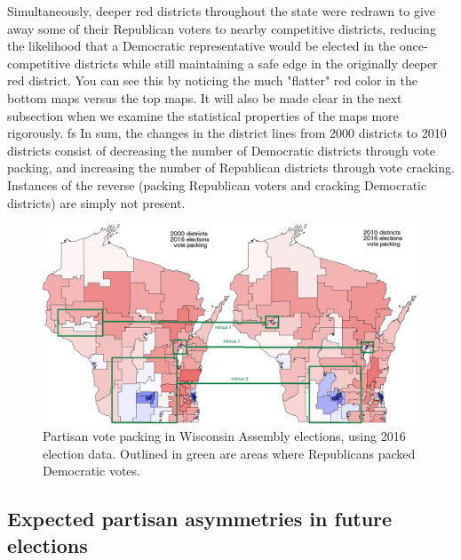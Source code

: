 \documentclass[preprint,12pt]{article}
\begin{document}
Simultaneously, deeper red districts throughout the state were redrawn to give away some of their Republican voters to nearby competitive districts, reducing the likelihood that a Democratic representative would be elected in the once-competitive districts while still maintaining a safe edge in the originally deeper red district.  
You can see this by noticing the much "flatter" red color in the bottom maps versus the top maps.
It will also be made clear in the next subsection when we examine the statistical properties of the maps more rigorously.
fs
In sum, the changes in the district lines from 2000 districts to 2010 districts consist of decreasing the number of Democratic districts through vote packing, and increasing the number of Republican districts through vote cracking.
Instances of the reverse (packing Republican voters and cracking Democratic districts) are simply not present.
\begin{figure}[htb!]
    \begin{center}
        \includegraphics[scale=0.40]{../Figures/WI_compared/districts_compared_deltas.png}
        \caption{Partisan vote packing in Wisconsin Assembly elections, using 2016 election data.  Outlined in green are areas where Republicans packed Democratic votes.}\label{fig:DistrictMapDelta}
    \end{center}
\end{figure}



\subsection{Expected  partisan asymmetries in future elections}
\end{document}

